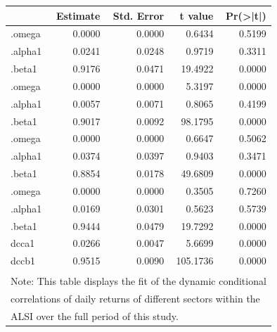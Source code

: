 \documentclass[11pt,preprint, authoryear]{elsarticle}
\let\origtable\table
\let\endorigtable\endtable
\renewenvironment{table}[1][2] {
    \expandafter\origtable\expandafter[H]
} {
    \endorigtable
}
\numberwithin{equation}{section}
\numberwithin{figure}{section}
\numberwithin{table}{section}
\begin{document}
\begin{table}

\caption{\label{tab:dccfitw}..... \label{dccfitw}}
\centering
\fontsize{9}{11}\selectfont
\begin{tabular}[t]{l|r|r|r|r}
\hline
  &  Estimate &  Std. Error &  t value & Pr(>|t|)\\
\hline
[Financials].omega & 0.0000 & 0.0000 & 0.6434 & 0.5199\\
\hline
[Financials].alpha1 & 0.0241 & 0.0248 & 0.9719 & 0.3311\\
\hline
[Financials].beta1 & 0.9176 & 0.0471 & 19.4922 & 0.0000\\
\hline
[Industrials].omega & 0.0000 & 0.0000 & 5.3197 & 0.0000\\
\hline
[Industrials].alpha1 & 0.0057 & 0.0071 & 0.8065 & 0.4199\\
\hline
[Industrials].beta1 & 0.9017 & 0.0092 & 98.1795 & 0.0000\\
\hline
[Property].omega & 0.0000 & 0.0000 & 0.6647 & 0.5062\\
\hline
[Property].alpha1 & 0.0374 & 0.0397 & 0.9403 & 0.3471\\
\hline
[Property].beta1 & 0.8854 & 0.0178 & 49.6809 & 0.0000\\
\hline
[Resources].omega & 0.0000 & 0.0000 & 0.3505 & 0.7260\\
\hline
[Resources].alpha1 & 0.0169 & 0.0301 & 0.5623 & 0.5739\\
\hline
[Resources].beta1 & 0.9444 & 0.0479 & 19.7292 & 0.0000\\
\hline
[Joint]dcca1 & 0.0266 & 0.0047 & 5.6699 & 0.0000\\
\hline
[Joint]dccb1 & 0.9515 & 0.0090 & 105.1736 & 0.0000\\
\hline
\multicolumn{5}{l}{\textsuperscript{} Note: This table displays the fit of the dynamic conditional}\\
\multicolumn{5}{l}{correlations of daily returns of different sectors within the}\\
\multicolumn{5}{l}{ALSI over the full period of this study.}\\
\end{tabular}
\end{table}
\end{document}
